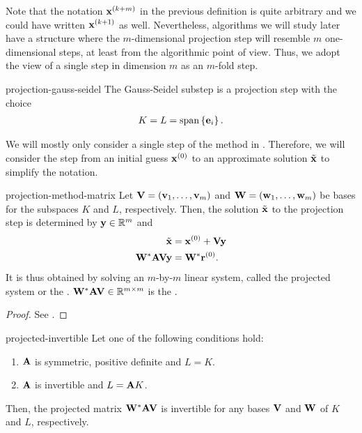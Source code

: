 Note that the notation $\mathbf x^{(k+m)}$ in the previous definition is
quite arbitrary and we could have written $\mathbf x^{(k+1)}$ as
well. Nevertheless, algorithms we will study later have a structure
where the $m$-dimensional projection step will resemble $m$
one-dimensional steps, at least from the algorithmic point of
view. Thus, we adopt the view of a single step in dimension $m$ as an
$m$-fold step.

\begin{Example}{projection-gauss-seidel}
  The Gauss-Seidel substep is a projection step with the choice
  \begin{gather}
    K=L=\operatorname{span}\left\{\mathbf e_i\right\}.
  \end{gather}
\end{Example}

\begin{notation}
  We will mostly only consider a single step of the method in
  . Therefore, we will consider
  the step from an initial guess $\mathbf x^{(0)}$ to an approximate solution
  $\tilde {\mathbf x}$ to simplify the notation.
\end{notation}

\begin{Definition}{projection-method-matrix}
  Let $\mathbf V=(\mathbf v_1,\dots,\mathbf v_m)$ and $\mathbf W=(\mathbf w_1,\dots,\mathbf w_m)$ be bases for
  the subspaces $K$ and $L$, respectively. Then, the solution
  $\tilde {\mathbf x}$ to the projection step is determined by $\mathbf y\in\mathbb R^m$ and
  \begin{align}
    \tilde{\mathbf x} &= \mathbf x^{(0)} + \mathbf V\mathbf y\\
    \mathbf W^*\mathbf A\mathbf V \mathbf y &= \mathbf W^* \mathbf r^{(0)}.
  \end{align}
  It is thus obtained by solving an $m$-by-$m$ linear system, called
  the projected system or the . $\mathbf W^*\mathbf A\mathbf V\in\mathbb R^{m\times m}$ is the
  .
\end{Definition}

\begin{proof}
  See \cite[Section 5.1.2]{Saad00}.
\end{proof}

\begin{Theorem}{projected-invertible}
  Let one of the following conditions hold:
  \begin{enumerate}
  \item $\mathbf A$ is symmetric, positive definite and $L=K$.
  \item $\mathbf A$ is invertible and $L = \mathbf A K$.
  \end{enumerate}
  Then, the projected matrix $\mathbf W^*\mathbf A\mathbf V$ is invertible for any
  bases $\mathbf V$ and $\mathbf W$ of $K$ and $L$, respectively.
\end{Theorem}

